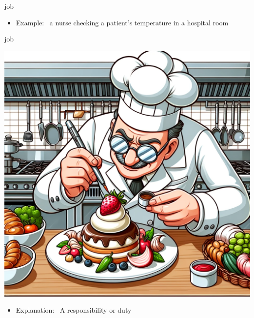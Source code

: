 \documentclass[avery5371, grid,frame]{flashcards}
\begin{document}
\begin{flashcard}{job}
\begin{center}
\begin{minipage}[c]{.45\textwidth}
\begin{itemize}
            \item Example: \ a nurse checking a patient's temperature in a hospital room
            \end{itemize}
        \end{minipage}
    \end{center}
    \vspace*{\fill}
\end{flashcard}\begin{flashcard}{job}
    \vspace*{\fill}
    \begin{center}
        \begin{minipage}[c]{.45\textwidth}
            \includegraphics[width=\textwidth]{cards/j/job/job - a chef meticulously decorating a gourmet dish in a busy kitchen.png}
        \end{minipage}
        \begin{minipage}[c]{.45\textwidth}
            \begin{itemize}\setlength\itemsep{12pt}
            \item Explanation: \ A responsibility or duty


\end{itemize}
\end{minipage}
\end{center}
\end{flashcard}
\end{document}
